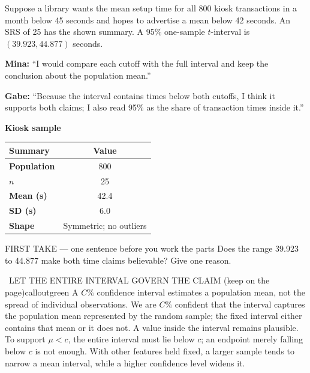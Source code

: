\documentclass[11pt]{article}
\begin{document}


Suppose a library wants the mean setup time for all 800 kiosk transactions in a month below 45 seconds and hopes to advertise a mean below 42 seconds. An SRS of 25 has the shown summary. A 95\% one-sample $t$-interval is $(39.923,44.877)$ seconds.\par\smallskip \textbf{Mina:} ``I would compare each cutoff with the full interval and keep the conclusion about the population mean.''\par \textbf{Gabe:} ``Because the interval contains times below both cutoffs, I think it supports both claims; I also read 95\% as the share of transaction times inside it.''\par
\begin{center}
\textbf{Kiosk sample}\par\smallskip
\begin{tabular}{|l|c|}
\hline
\textbf{Summary} & \textbf{Value} \\ \hline
\textbf{Population} & 800 \\ \hline
\textbf{$n$} & 25 \\ \hline
\textbf{Mean (s)} & 42.4 \\ \hline
\textbf{SD (s)} & 6.0 \\ \hline
\textbf{Shape} & Symmetric; no outliers \\ \hline
\end{tabular}
\end{center}
\begin{firsttakebox}{FIRST TAKE --- one sentence before you work the parts}
Does the range 39.923 to 44.877 make both time claims believable? Give one reason.
\workspace{0.9in}
\end{firsttakebox}

\begin{callout}{\IconBook\ LET THE ENTIRE INTERVAL GOVERN THE CLAIM (keep on the page)}{calloutgreen}
A $C\%$ confidence interval estimates a population mean, not the spread of individual observations.
We are $C\%$ confident that the interval captures the population mean represented by the random sample;
the fixed interval either contains that mean or it does not. A value inside the interval remains plausible.
To support $\mu<c$, the entire interval must lie below $c$; an endpoint merely falling below $c$ is not enough.
With other features held fixed, a larger sample tends to narrow a mean interval, while a higher confidence
level widens it.
\end{callout}
\end{document}
